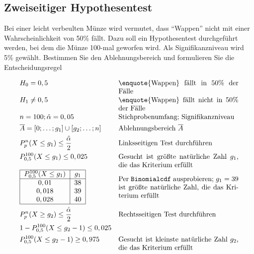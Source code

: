 \documentclass[10pt]{article}
\begin{document}
\subsection{Zweiseitiger Hypothesentest}
\begin{example}
Bei einer leicht verbeulten Münze wird vermutet, dass \enquote{Wappen} nicht mit einer
Wahrscheinlichkeit von 50\% fällt. Dazu soll ein Hypothesentest durchgeführt werden, bei dem
die Münze 100-mal geworfen wird. Als Signifikanzniveau wird 5\% gewählt. Bestimmen Sie den Ablehnungsbereich und formulieren Sie die Entscheidungsregel

\addtolength{\jot}{1em}
\begin{align*}
&H_0 = 0,5 &\parbox[t]{0.5\linewidth}{\enquote{Wappen} fällt in 50\% der Fälle} \\
&H_1 \neq 0,5 &\parbox[t]{0.5\linewidth}{\enquote{Wappen} fällt nicht in 50\% der Fälle} \\
&n = 100; \hat\alpha = 0,05 &\parbox[t]{0.5\linewidth}{Stichprobenumfang; Signifikanzniveau} \\
&\overline A = [0;\dots;g_1] \cup [g_2;\dots;n] &\parbox[t]{0.5\linewidth}{Ablehnungsbereich $\overline A$} \\
&P^n_p(X \leq g_1) \leq \frac{\hat\alpha}{2} &\parbox[t]{0.5\linewidth}{Linksseitigen Test durchführen} \\
&P^{100}_{0,5}(X \leq g_1) \leq 0,025 &\parbox[t]{0.5\linewidth}{Gesucht ist größte natürliche Zahl $g_1$, die das Kriterium erfüllt} \\
& \begin{tabular}{|c|c|}
	\hline
	$P^{100}_{0,5}(X \leq g_1)$ & $g_1$ \\ \hline
	$0,01$ & $38$ \\
	$0,018$ & $39$ \\
	$0,028$ & $40$ \\
	\hline
	\end{tabular} &\parbox{0.5\linewidth}{Per \texttt{Binomialcdf} ausprobieren; $g_1 = 39$ ist größte natürliche Zahl, die das Kriterium erfüllt}\\
&P^n_p(X \geq g_2) \leq \frac{\hat\alpha}{2} &\parbox[t]{0.5\linewidth}{Rechtsseitigen Test durchführen} \\
&1 - P^{100}_{0,5}(X \leq g_2 - 1) \leq 0,025 &\parbox[t]{0.5\linewidth}{} \\
&P^{100}_{0,5}(X \leq g_2 - 1) \geq 0,975 &\parbox[t]{0.5\linewidth}{Gesucht ist kleinste natürliche Zahl $g_2$, die das Kriterium erfüllt} \\
& \begin{tabular}{|c|c|}

\end{tabular}
\end{align*}
\end{example}
\end{document}
